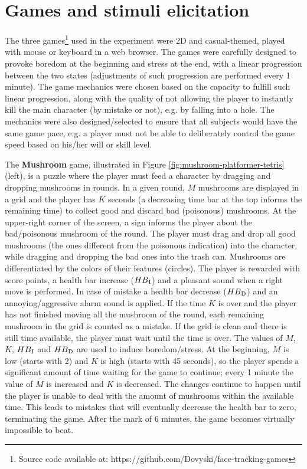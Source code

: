 \section{Games and stimuli elicitation}
\label{sec:experiment1-games-elicitation}

The three games\footnote{Source code available at: https://github.com/Dovyski/face-tracking-games} used in the experiment were 2D and casual-themed, played with mouse or keyboard in a web browser. The games were carefully designed to provoke boredom at the beginning and stress at the end, with a linear progression between the two states (adjustments of such progression are performed every 1 minute). The game mechanics were chosen based on the capacity to fulfill such linear progression, along with the quality of not allowing the player to instantly kill the main character (by mistake or not), e.g. by falling into a hole. The mechanics were also designed/selected to ensure that all subjects would have the same game pace, e.g. a player must not be able to deliberately control the game speed based on his/her will or skill level.

The \textbf{Mushroom} game, illustrated in Figure \ref{fig:mushroom-platformer-tetris} (left), is a puzzle where the player must feed a character by dragging and dropping mushrooms in rounds. In a given round, $M$ mushrooms are displayed in a grid and the player has $K$ seconds (a decreasing time bar at the top informs the remaining time) to collect good and discard bad (poisonous) mushrooms. At the upper-right corner of the screen, a sign informs the player about the bad/poisonous mushroom of the round. The player must drag and drop all good mushrooms (the ones different from the poisonous indication) into the character, while dragging and dropping the bad ones into the trash can. Mushrooms are differentiated by the colors of their features (circles). The player is rewarded with score points, a health bar increase ($HB\textsubscript{I}$) and a pleasant sound when a right move is performed. In case of mistake a health bar decrease ($HB\textsubscript{D}$) and an annoying/aggressive alarm sound is applied. If the time $K$ is over and the player has not finished moving all the mushroom of the round, each remaining mushroom in the grid is counted as a mistake. If the grid is clean and there is still time available, the player must wait until the time is over. The values of $M$, $K$, $HB\textsubscript{I}$ and $HB\textsubscript{D}$ are used to induce boredom/stress. At the beginning, $M$ is low (starts with 2) and $K$ is high (starts with 45 seconds), so the player spends a significant amount of time waiting for the game to continue; every 1 minute the value of $M$ is increased and $K$ is decreased. The changes continue to happen until the player is unable to deal with the amount of mushrooms within the available time. This leads to mistakes that will eventually decrease the health bar to zero, terminating the game. After the mark of 6 minutes, the game becomes virtually impossible to beat.

